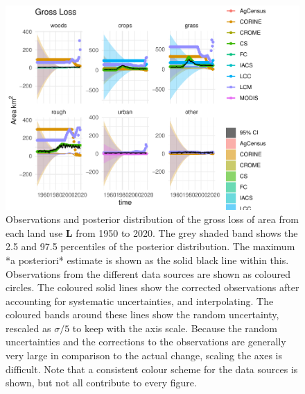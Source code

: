 \documentclass[
]{book}
\begin{document}
\begin{figure}
\includegraphics[width=1.3\linewidth]{Results_wa_files/figure-latex/plotL-1} \caption{ Observations and posterior distribution of the gross loss of area from each land use $\mathbf{L}$ from 1950 to 2020.  The grey shaded band shows the 2.5 and 97.5 percentiles of the posterior distribution. The maximum *a posteriori* estimate is shown as the solid black line within this. Observations from the different data sources are shown as coloured circles. The coloured solid lines show the corrected observations after accounting for systematic uncertainties, and interpolating. The coloured bands around these lines show the random uncertainty, rescaled as $\sigma /5$ to keep with the axis scale. Because the random uncertainties and the corrections to the observations are generally very large in comparison to the actual change, scaling the axes is difficult. Note that a consistent colour scheme for the data sources is shown, but not all contribute to every figure.}\label{fig:plotL}
\end{figure}
\end{document}
